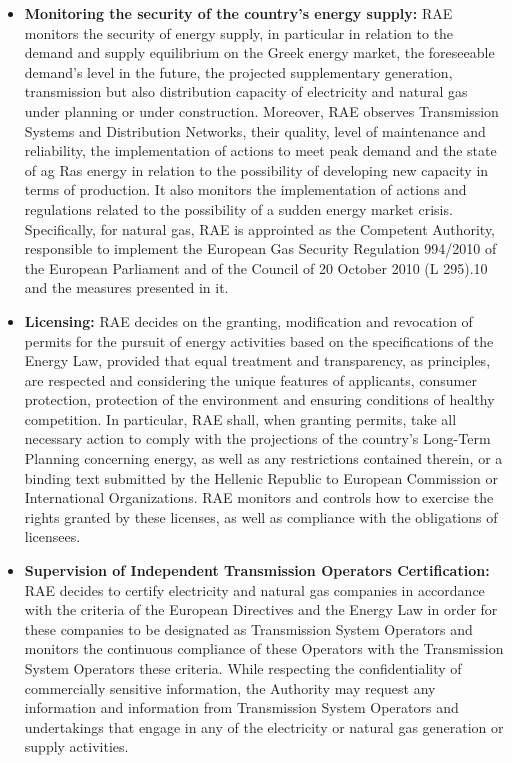 \begin{itemize}
\item{\textbf{Monitoring the security of the country's energy supply:}}
RAE monitors the security of energy supply, in particular in relation to the demand and supply equilibrium on the Greek energy market, the foreseeable demand’s level in the future, the projected supplementary generation, transmission but also distribution capacity of electricity and natural gas under planning or under construction. Moreover, RAE observes Transmission Systems and Distribution Networks, their quality, level of maintenance and reliability, the implementation of actions to meet peak demand and the state of ag Ras energy in relation to the possibility of developing new capacity in terms of production. It also monitors the implementation of actions and regulations related to the possibility of a sudden energy market crisis. Specifically, for natural gas, RAE is approinted as the Competent Authority, responsible to implement the European Gas Security Regulation 994/2010 of the European Parliament and of the Council of 20 October 2010 (L 295).10 and the measures presented in it.  
\item{\textbf{Licensing:}}
RAE decides on the granting, modification and revocation of permits for the pursuit of energy activities based on the specifications of the Energy Law, provided that equal treatment and transparency, as principles, are respected and considering the unique features of applicants, consumer protection, protection of the environment and ensuring conditions of healthy competition. In particular, RAE shall, when granting permits, take all necessary action to comply with the projections of the country’s Long-Term Planning concerning energy, as well as any restrictions contained therein, or a binding text submitted by the Hellenic Republic to European Commission or International Organizations. RAE monitors and controls how to exercise the rights granted by these licenses, as well as compliance with the obligations of licensees.
\item{\textbf{Supervision of Independent Transmission Operators Certification:}}
RAE decides to certify electricity and natural gas companies in accordance with the criteria of the European Directives and the Energy Law in order for these companies to be designated as Transmission System Operators and monitors the continuous compliance of these Operators with the Transmission System Operators these criteria. While respecting the confidentiality of commercially sensitive information, the Authority may request any information and information from Transmission System Operators and undertakings that engage in any of the electricity or natural gas generation or supply activities.

\end{itemize}
